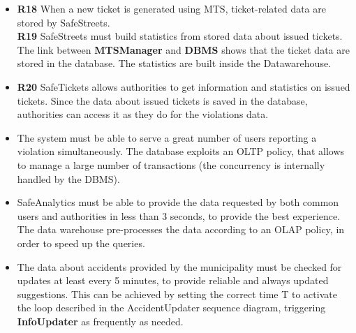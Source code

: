 \documentclass[./main.tex]{subfiles}
\begin{document}

\begin{itemize}
\item
  \textbf{R18} When a new ticket is generated using MTS, ticket-related
  data are stored by SafeStreets.\\
  \textbf{R19} SafeStreets must build statistics from stored data about
  issued tickets.
  \subitem
    The link between \textbf{MTSManager} and \textbf{DBMS} shows that the ticket data are stored in the database. The statistics are built inside the Datawarehouse.

\item
  \textbf{R20} SafeTickets allows authorities to get information and
  statistics on issued tickets.
  \subitem
    Since the data about issued tickets is saved in the database, authorities can access it as they do for the violations data.
\end{itemize}

\begin{itemize}
\item
  The system must be able to serve a great number of users reporting a
  violation simultaneously.
  \subitem
  	The database exploits an OLTP policy, that allows to manage a large number of transactions (the concurrency is internally handled by the DBMS).
\item
  SafeAnalytics must be able to provide the data requested by both
  common users and authorities in less than 3 seconds, to provide the
  best experience.
  \subitem 
  	The data warehouse pre-processes the data according to an OLAP policy, in order to speed up the queries.
\item
  The data about accidents provided by the municipality must be checked
  for updates at least every 5 minutes, to provide reliable and always
  updated suggestions.
  \subitem
    This can be achieved by setting the correct time T to activate the loop described in the AccidentUpdater sequence diagram, triggering \textbf{InfoUpdater} as frequently as needed.
\end{itemize}
\end{document}
